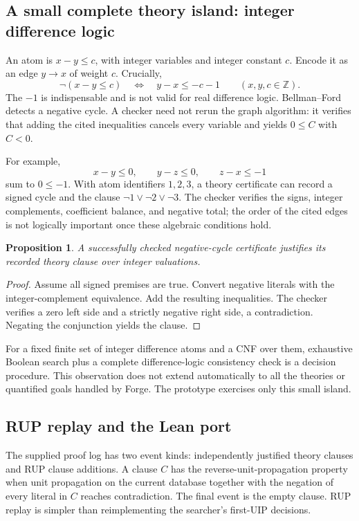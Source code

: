 \documentclass[11pt,letterpaper]{article}
\newcommand{\Z}{\mathbb{Z}}
\newtheorem{proposition}{Proposition}[section]
\theoremstyle{definition}\newtheorem{definition}[proposition]{Definition}
\begin{document}
\subsection{A small complete theory island: integer difference logic}
An atom is $x-y\le c$, with integer variables and integer constant $c$. Encode it as an edge $y\to x$ of weight $c$. Crucially,
\[
\neg(x-y\le c)\quad\Longleftrightarrow\quad y-x\le -c-1
\qquad(x,y,c\in\Z).
\]
The $-1$ is indispensable and is not valid for real difference logic. Bellman--Ford detects a negative cycle. A checker need not rerun the graph algorithm: it verifies that adding the cited inequalities cancels every variable and yields $0\le C$ with $C<0$.

For example,
\[
x-y\le0,\qquad y-z\le0,\qquad z-x\le-1
\]
sum to $0\le-1$. With atom identifiers $1,2,3$, a theory certificate can record a signed cycle and the clause $\neg1\lor\neg2\lor\neg3$. The checker verifies the signs, integer complements, coefficient balance, and negative total; the order of the cited edges is not logically important once these algebraic conditions hold.

\begin{proposition}
A successfully checked negative-cycle certificate justifies its recorded theory clause over integer valuations.
\end{proposition}
\begin{proof}
Assume all signed premises are true. Convert negative literals with the integer-complement equivalence. Add the resulting inequalities. The checker verifies a zero left side and a strictly negative right side, a contradiction. Negating the conjunction yields the clause.
\end{proof}

For a fixed finite set of integer difference atoms and a CNF over them, exhaustive Boolean search plus a complete difference-logic consistency check is a decision procedure. This observation does not extend automatically to all the theories or quantified goals handled by Forge. The prototype exercises only this small island.

\subsection{RUP replay and the Lean port}
The supplied proof log has two event kinds: independently justified theory clauses and RUP clause additions. A clause $C$ has the reverse-unit-propagation property when unit propagation on the current database together with the negation of every literal in $C$ reaches contradiction. The final event is the empty clause. RUP replay is simpler than reimplementing the searcher's first-UIP decisions.
\end{document}
